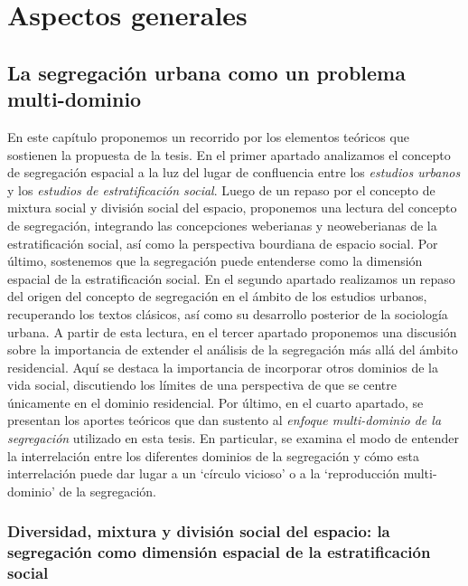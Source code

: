 \documentclass[
  spanish,
  a4paper,%
  chapterprefix=true,%
  DIV=calc,%
  twoside]{scrbook}%
\begin{document}
\part{Aspectos generales}\label{part-aspectos-generales}

\chapter{La segregación urbana como un problema multi-dominio}\label{lit}

En este capítulo proponemos un recorrido por los elementos teóricos que
sostienen la propuesta de la tesis. En el primer apartado analizamos el
concepto de segregación espacial a la luz del lugar de confluencia entre
los \emph{estudios urbanos} y los \emph{estudios de estratificación social}. Luego
de un repaso por el concepto de mixtura social y división social del
espacio, proponemos una lectura del concepto de segregación, integrando
las concepciones weberianas y neoweberianas de la estratificación
social, así como la perspectiva bourdiana de espacio social. Por último,
sostenemos que la segregación puede entenderse como la dimensión
espacial de la estratificación social. En el segundo apartado realizamos
un repaso del origen del concepto de segregación en el ámbito de los
estudios urbanos, recuperando los textos clásicos, así como su
desarrollo posterior de la sociología urbana. A partir de esta lectura,
en el tercer apartado proponemos una discusión sobre la importancia de
extender el análisis de la segregación más allá del ámbito residencial.
Aquí se destaca la importancia de incorporar otros dominios de la vida
social, discutiendo los límites de una perspectiva de que se centre
únicamente en el dominio residencial. Por último, en el cuarto apartado,
se presentan los aportes teóricos que dan sustento al \emph{enfoque
multi-dominio de la segregación} utilizado en esta tesis. En particular,
se examina el modo de entender la interrelación entre los diferentes
dominios de la segregación y cómo esta interrelación puede dar lugar a
un `círculo vicioso' o a la `reproducción multi-dominio' de la
segregación.

\section{Diversidad, mixtura y división social del espacio: la segregación como dimensión espacial de la estratificación social}\label{lit-estratif}
\end{document}
